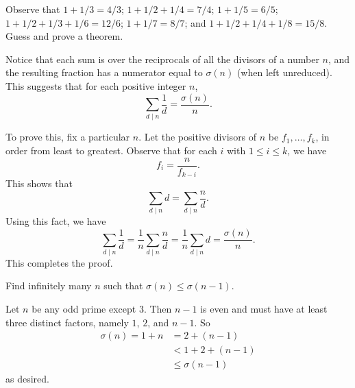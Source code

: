  Observe that $1 + 1/3 = 4/3$; $1 + 1/2 + 1/4 = 7/4$;
$1 + 1/5 = 6/5$; $1 + 1/2 + 1/3 + 1/6 = 12/6$; $1 + 1/7 = 8/7$; and
$1 + 1/2 + 1/4 + 1/8 = 15/8$. Guess and prove a theorem.
\begin{solution}
  Notice that each sum is over the reciprocals of all the divisors of
  a number $n$, and the resulting fraction has a numerator equal to
  $\sigma(n)$ (when left unreduced). This suggests that for each
  positive integer $n$,
  \begin{equation*}
    \sum_{d\mid n}\frac1d = \frac{\sigma(n)}n.
  \end{equation*}

  To prove this, fix a particular $n$. Let the positive divisors of
  $n$ be $f_1,\dots,f_k$, in order from least to greatest. Observe
  that for each $i$ with $1\leq i\leq k$, we have
  \begin{equation*}
    f_i = \frac{n}{f_{k-i}}.
  \end{equation*}
  This shows that
  \begin{equation*}
    \sum_{d\mid n}d = \sum_{d\mid n}\frac{n}d.
  \end{equation*}
  Using this fact, we have
  \begin{equation*}
    \sum_{d\mid n}\frac1d = \frac1n\sum_{d\mid n}\frac{n}d
    = \frac1n\sum_{d\mid n}d
    = \frac{\sigma(n)}n.
  \end{equation*}
  This completes the proof.
\end{solution}

 Find infinitely many $n$ such that
$\sigma(n) \leq \sigma(n - 1)$.
\begin{solution}
  Let $n$ be any odd prime except $3$. Then $n - 1$ is even and must
  have at least three distinct factors, namely $1$, $2$, and $n-1$. So
  \begin{align*}
    \sigma(n) = 1 + n &= 2 + (n - 1) \\
                      &< 1 + 2 + (n - 1) \\
                      &\leq \sigma(n - 1)
  \end{align*}
  as desired.
\end{solution}
